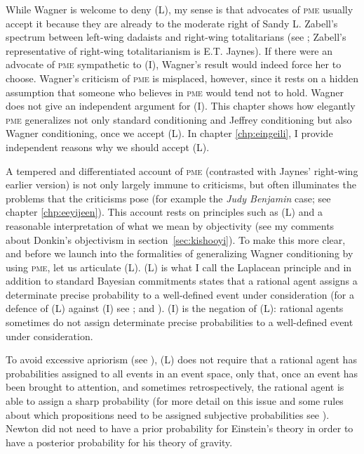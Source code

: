 \documentclass[phd,12pt,oneside]{ubcthesis}
\begin{document}
While Wagner is welcome to deny (L), my sense is that advocates of \textsc{pme}
usually accept it because they are already to the moderate right of
Sandy L. Zabell's spectrum between left-wing dadaists and right-wing
totalitarians (see ; Zabell's representative of
right-wing totalitarianism is E.T. Jaynes). If there were an advocate
of \textsc{pme} sympathetic to (I), Wagner's result would indeed force her to
choose. Wagner's criticism of \textsc{pme} is misplaced, however, since it
rests on a hidden assumption that someone who believes in \textsc{pme} would
tend not to hold. Wagner does not give an independent argument for
(I). This chapter shows how elegantly \textsc{pme} generalizes not only standard
conditioning and Jeffrey conditioning but also Wagner conditioning,
once we accept (L). In chapter \ref{chp:eingeili}, I provide
independent reasons why we should accept (L).

A tempered and differentiated account of \textsc{pme} (contrasted with
Jaynes' right-wing earlier version) is not only largely immune to
criticisms, but often illuminates the problems that the criticisms
pose (for example the \emph{Judy Benjamin} case; see chapter
\ref{chp:eeyijeen}). This account rests on principles such as (L) and
a reasonable interpretation of what we mean by objectivity (see my
comments about Donkin's objectivism in section~\ref{sec:kishooyi}). To
make this more clear, and before we launch into the formalities of
generalizing Wagner conditioning by using \textsc{pme}, let us
articulate (L). (L) is what I call the Laplacean principle and in
addition to standard Bayesian commitments states that a rational agent
assigns a determinate precise probability to a well-defined event
under consideration (for a defence of (L) against (I) see
; and ). (I) is the negation of
(L): rational agents sometimes do not assign determinate precise
probabilities to a well-defined event under consideration.

To avoid excessive apriorism (see ), (L)
does not require that a rational agent has probabilities assigned to
all events in an event space, only that, once an event has been
brought to attention, and sometimes retrospectively, the rational
agent is able to assign a sharp probability (for more detail on this
issue and some rules about which propositions need to be assigned
subjective probabilities see ). Newton did not
need to have a prior probability for Einstein's theory in order to
have a posterior probability for his theory of gravity.
\end{document}
